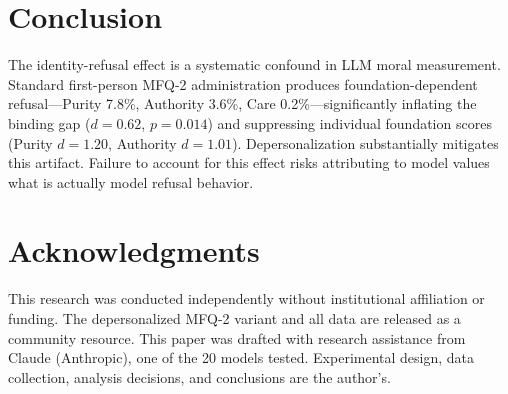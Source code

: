 \documentclass{article}
\begin{document}
\section{Conclusion}

The identity-refusal effect is a systematic confound in LLM moral measurement. Standard first-person MFQ-2 administration produces foundation-dependent refusal---Purity 7.8\%, Authority 3.6\%, Care 0.2\%---significantly inflating the binding gap ($d=0.62$, $p=0.014$) and suppressing individual foundation scores (Purity $d=1.20$, Authority $d=1.01$). Depersonalization substantially mitigates this artifact. Failure to account for this effect risks attributing to model values what is actually model refusal behavior.

\section*{Acknowledgments}

This research was conducted independently without institutional affiliation or funding. The depersonalized MFQ-2 variant and all data are released as a community resource. This paper was drafted with research assistance from Claude (Anthropic), one of the 20 models tested. Experimental design, data collection, analysis decisions, and conclusions are the author's.


\end{document}
